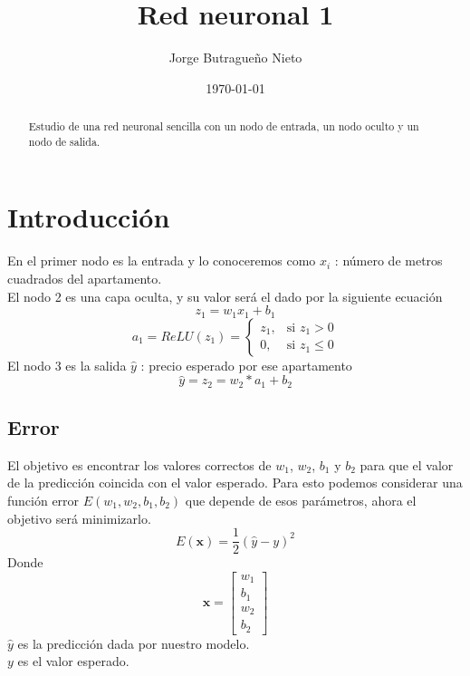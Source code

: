 \documentclass{article}
\title{Red neuronal 1}
\author{Jorge Butragueño Nieto}
\date{\today}
\begin{document}
	
	\maketitle
	
	\begin{abstract}
		Estudio de una red neuronal sencilla con un nodo de entrada, un nodo oculto y un nodo de salida.
	\end{abstract}
	\section{Introducción}
		
		En el primer nodo es la entrada y lo conoceremos como $x_i$ : número de metros cuadrados del apartamento.\\
		El nodo 2 es una capa oculta, y su valor será el dado por la siguiente ecuación
		\[
		z_1 = w_1x_1 + b_1
		\]
		\[
		a_1 = ReLU(z_1) = 	\begin{cases}
			z_1, & \text{si } z_1 > 0 \\
			0, & \text{si } z_1 \leq 0
		\end{cases}
		\]
		El nodo 3 es la salida $\hat{y}$ : precio esperado por ese apartamento
		\[
		\hat{y} = z_2  = w_2 * a_1 + b_2
		\]
		
	\subsection{Error}
	El objetivo es encontrar los valores correctos de $w_1$, $w_2$, $b_1$ y $b_2$ para que el valor de la predicción coincida con el valor esperado. Para esto podemos considerar una función error $E(w_1, w_2, b_1, b_2)$ que depende de esos parámetros, ahora el objetivo será minimizarlo.
	\[
	E(\textbf{x}) = \frac{1}{2}(\hat{y} - y )^2
	\]
	Donde 
	\[
	\textbf{x} = \begin{bmatrix} 
		w_1\\
		b_1\\
		w_2\\
		b_2
	\end{bmatrix}
	\]
	$\hat{y}$ es la predicción dada por nuestro modelo.\\
	 $y$ es el valor esperado.\\
\end{document}
